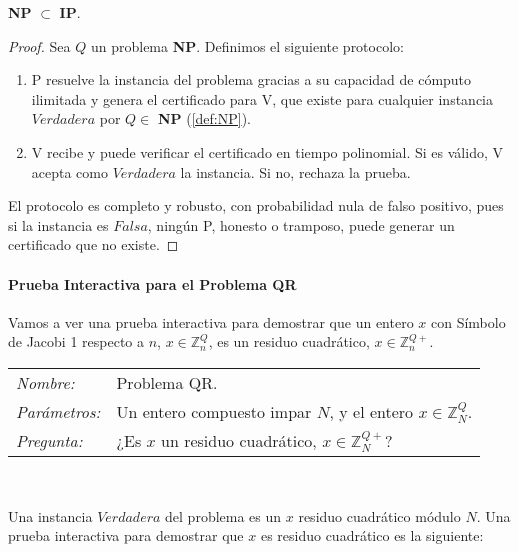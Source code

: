 \begin{proposition}
	\textbf{NP} $\subset$ \textbf{IP}.
\end{proposition}

\begin{proof}
	Sea $Q$ un problema \textbf{NP}. Definimos el siguiente protocolo:

	\begin{enumerate}
		\item  P resuelve la instancia del problema gracias a su capacidad de cómputo ilimitada y genera el certificado para V, que existe para cualquier instancia $Verdadera$ por $Q\in$ \textbf{NP} (\ref{def:NP}).
		\item  V recibe y puede verificar el certificado en tiempo polinomial. Si es válido, V acepta como $Verdadera$ la instancia. Si no, rechaza la prueba.
	\end{enumerate}

	El protocolo es completo y robusto, con probabilidad nula de falso positivo, pues si la instancia es $Falsa$, ningún P, honesto o tramposo, puede generar un certificado que no existe.

\end{proof}


\hfil

\paragraph{Prueba Interactiva para el Problema QR}

\hfil

\hfil

Vamos a ver una prueba interactiva para demostrar que un entero $x$ con Símbolo de Jacobi 1 respecto a $n$, $x \in \mathbb{Z}^Q_n$, es un residuo cuadrático, $x \in \mathbb{Z}^{Q+}_n$.

\hfil

\begin{tabular}{|ll}
	\textit{Nombre:} & Problema QR. \\
	\textit{Parámetros:} &Un entero compuesto impar $N$, y el entero $x\in \mathbb{Z}^Q_N$. \\
	\textit{Pregunta:} & ¿Es $x$ un residuo cuadrático, $x \in \mathbb{Z}^{Q+}_N$? \\
\end{tabular}
\\

\hfil

Una instancia $Verdadera$ del problema es un $x$ residuo cuadrático módulo $N$. Una prueba interactiva para demostrar que $x$ es residuo cuadrático es la siguiente:

